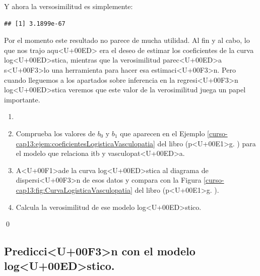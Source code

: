 \documentclass[10pt,a4paper]{article}
\begin{document}
Y ahora la versosimilitud es simplemente:
\begin{knitrout}
\color{fgcolor}\begin{kframe}
\begin{alltt}
 \hlkwb{=} 
\end{alltt}
\begin{verbatim}
## [1] 3.1899e-67
\end{verbatim}
\end{kframe}
\end{knitrout}

Por el momento este resultado no parece de mucha utilidad. Al fin y al cabo, lo que nos trajo aqu<U+00ED> era el deseo de estimar los coeficientes de la curva log<U+00ED>stica, mientras que la verosimilitud parec<U+00ED>a s<U+00F3>lo una herramienta para hacer esa estimaci<U+00F3>n. Pero cuando lleguemos a los apartados sobre inferencia en la regresi<U+00F3>n log<U+00ED>stica veremos que este valor de la verosimilitud juega un papel importante.


\begin{ejercicio}
\label{tut13:ejercicio05}

\begin{enumerate}
\item[]

\item Comprueba los valores de $b_0$ y $b_1$ que aparecen en el Ejemplo \ref{curso-cap13:ejem:coeficientesLogisticaVasculopatia} del libro (p<U+00E1>g. \pageref{curso-cap13:ejem:coeficientesLogisticaVasculopatia}) para el modelo que relaciona itb y vasculopat<U+00ED>a.

\item A<U+00F1>ade la curva log<U+00ED>stica al diagrama  de dispersi<U+00F3>n de esos datos y compara con la Figura \ref{curso-cap13:fig:CurvaLogisticaVasculopatia} del libro (p<U+00E1>g. \pageref{curso-cap13:fig:CurvaLogisticaVasculopatia}).

\item Calcula la verosimilitud de ese modelo log<U+00ED>stico.

\end{enumerate}

\qed
\end{ejercicio}


\subsection{Predicci<U+00F3>n con el modelo log<U+00ED>stico.}
\label{tut13:subsec:PrediccionConModeloLogistico}
\end{document}

